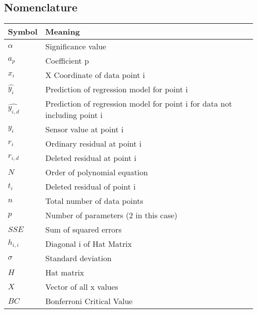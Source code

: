 \documentclass{article}
\begin{document}
\subsection{Nomenclature}
	
\begin{table}[h!]
	\begin{center}

		\begin{tabular}{l|l} %
			\textbf{Symbol} & \textbf{Meaning} \\
			\hline
			$\alpha$ & Significance value\\
			$a_p$ & Coefficient p\\
			$x_i$ & X Coordinate of data point i\\
			$\hat{y_i}$ & Prediction of regression model for point i \\
			$\hat{y_{i,d}}$ & Prediction of regression model for point i for data not including point i \\
			$y_i$ & Sensor value at point i \\
			$r_i$ & Ordinary residual at point i \\
			$r_{i, d}$ & Deleted residual at point i \\
			$N$ & Order of polynomial equation \\
			$t_i$ & Deleted residual of point i \\
			$n$ & Total number of data points \\
			$p$ & Number of parameters (2 in this case) \\
			$SSE$ & Sum of squared errors \\
			$h_{i,i}$ & Diagonal i of Hat Matrix \\
			$\sigma$ & Standard deviation \\
			$H$ & Hat matrix \\
			$X$ & Vector of all x values \\
			$BC$ & Bonferroni Critical Value \\
		\end{tabular}
	\end{center}
\end{table}
\end{document}
